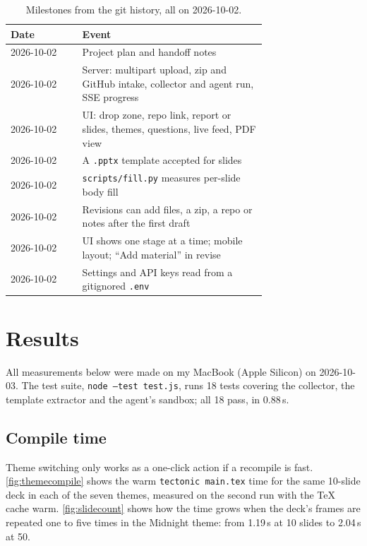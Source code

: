 \documentclass[11pt]{article}
\begin{document}
\begin{table}[htbp]
\centering
\caption{Milestones from the git history, all on 2026-10-02.}
\label{tab:milestones}
\begin{tabular}{lp{0.72\linewidth}}
\toprule
Date & Event \\
\midrule
2026-10-02 & Project plan and handoff notes \\
2026-10-02 & Server: multipart upload, zip and GitHub intake, collector and agent run, SSE progress \\
2026-10-02 & UI: drop zone, repo link, report or slides, themes, questions, live feed, PDF view \\
2026-10-02 & A \texttt{.pptx} template accepted for slides \\
2026-10-02 & \texttt{scripts/fill.py} measures per-slide body fill \\
2026-10-02 & Revisions can add files, a zip, a repo or notes after the first draft \\
2026-10-02 & UI shows one stage at a time; mobile layout; ``Add material'' in revise \\
2026-10-02 & Settings and API keys read from a gitignored \texttt{.env} \\
\bottomrule
\end{tabular}
\end{table}

\section{Results}
\label{sec:results}

All measurements below were made on my MacBook (Apple Silicon) on 2026-10-03. The test suite, \texttt{node --test test.js}, runs 18 tests covering the collector, the template extractor and the agent's sandbox; all 18 pass, in 0.88\,s.

\subsection{Compile time}

Theme switching only works as a one-click action if a recompile is fast. \autoref{fig:themecompile} shows the warm \texttt{tectonic main.tex} time for the same 10-slide deck in each of the seven themes, measured on the second run with the TeX cache warm. \autoref{fig:slidecount} shows how the time grows when the deck's frames are repeated one to five times in the Midnight theme: from 1.19\,s at 10 slides to 2.04\,s at 50.
\end{document}
